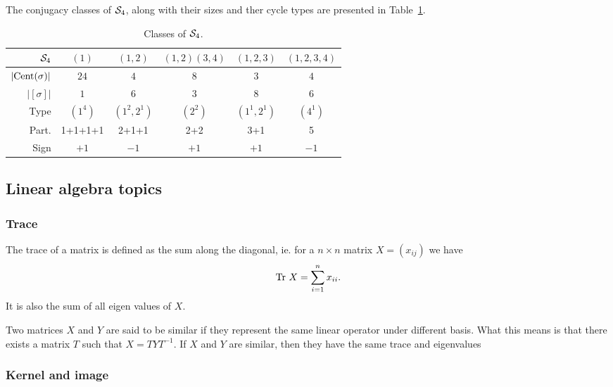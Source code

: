 \begin{example}[$\Sym_4$]
	The conjugacy classes of $\Sym_4$, along with their sizes and ther cycle types are presented in Table~\ref{table:elementsSym4}.
	\begin{table}[hbt!]
		\centering
		\begin{tabular}{r | c c c c c}
			         $\Sym_4$ & $(1)$     & $(1,2)$     & $(1,2)(3,4)$ & $(1,2,3)$   & $(1,2,3,4)$ \\ \hline
			$|\text{Cent}(\sigma)|$ & $24$      & $4$         & $8$          & $3$         & $4$         \\
			     $|[\sigma]|$ & $1$       & $6$         & $3$          & $8$         & $6$         \\
			             Type & $(1^4)$   & $(1^2,2^1)$ & $(2^2)$      & $(1^1,2^1)$ & $(4^1)$     \\
			            Part. & 1+1+1+1 & 2+1+1       & 2+2          & 3+1         & 5           \\
			             Sign & $+1$      & $-1$        & $+1$         & $+1$        & $-1$
		\end{tabular}
		\caption{Classes of $\Sym_4$.}
		\label{table:elementsSym4}
	\end{table}
\end{example}


\subsection{Linear algebra topics}

	\subsubsection{Trace}
		
		The trace of a matrix is defined as the sum along the diagonal, ie. for a $n \times n$ matrix $X = (x_{ij})$ we have
		\begin{align*}
			\text{Tr } X = \sum_{i=1}^{n} x_{ii}.
		\end{align*}
		It is also the sum of all eigen values of $X$.
		
		Two matrices $X$ and $Y$ are said to be similar if they represent the same linear operator under different basis. What this means is that there exists a matrix $T$ such that $X = TYT^{-1}$. If $X$ and $Y$ are similar, then they have the same trace and eigenvalues~\cite[Thm.5.5.1.]{Nicholson}

	\subsubsection{Kernel and image}
	
